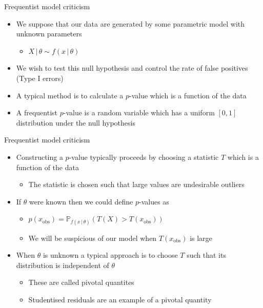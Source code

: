 \begin{frame}{Frequentist model criticism}
  \begin{itemize}
    \item We suppose that our data are generated by some parametric model with unknown parameters
    \begin{itemize}
      \item $X \,|\, \theta \sim f(x\,|\,\theta)$
    \end{itemize}
    \vspace{\baselineskip}
    \pause
    \item We wish to test this null hypothesis and control the rate of false positives (Type I errors)
    \vspace{\baselineskip}
    \pause
    \item A typical method is to calculate a $p$-value which is a function of the data
    \vspace{\baselineskip}
    \pause
    \item A frequentist $p$-value is a random variable which has a uniform $[0,1]$ distribution under the null hypothesis
  \end{itemize}
\end{frame}

\begin{frame}{Frequentist model criticism}
  \begin{itemize}
    \item Constructing a $p$-value typically proceeds by choosing a statistic $T$ which is a function of the data
    \begin{itemize}
      \item The statistic is chosen such that large values are undesirable \eg outliers
    \end{itemize}
    \vspace{\baselineskip}
    \pause
    \item If $\theta$ were known then we could define $p$-values as
    \begin{itemize}
      \item $p(x_{\textrm{obs}}) = \mathbb{P}_{f(x\,|\,\theta)}(T(X) > T(x_{\textrm{obs}}))$
      \item \ie We will be suspicious of our model when $T(x_{\textrm{obs}})$ is large
    \end{itemize}
    \vspace{\baselineskip}
    \pause
    \item When $\theta$ is unknown a typical approach is to choose $T$ such that its distribution is independent of $\theta$
    \begin{itemize}
      \item These are called pivotal quantites
      \item Studentised residuals are an example of a pivotal quantity
    \end{itemize}
  \end{itemize}
\end{frame}

